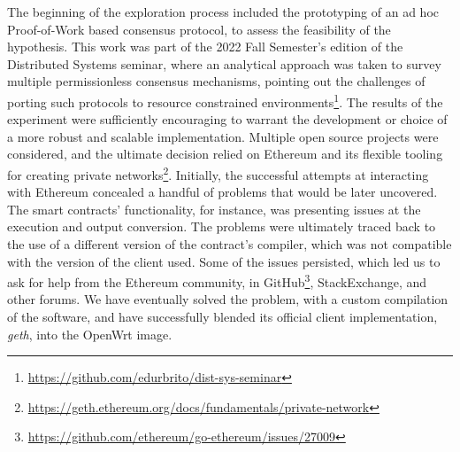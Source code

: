 The beginning of the exploration process included the prototyping of an ad hoc Proof-of-Work based consensus protocol, to assess the feasibility of the hypothesis. This work was part of the 2022 Fall Semester's edition of the Distributed Systems seminar, where an analytical approach was taken to survey multiple permissionless consensus mechanisms, pointing out the challenges of porting such protocols to resource constrained environments\footnote{\url{https://github.com/edurbrito/dist-sys-seminar}}. The results of the experiment were sufficiently encouraging to warrant the development or choice of a more robust and scalable implementation. Multiple open source projects were considered, and the ultimate decision relied on Ethereum and its flexible tooling for creating private networks\footnote{\url{https://geth.ethereum.org/docs/fundamentals/private-network}}. Initially, the successful attempts at interacting with Ethereum concealed a handful of problems that would be later uncovered. The smart contracts' functionality, for instance, was presenting issues at the execution and output conversion. The problems were ultimately traced back to the use of a different version of the contract's compiler, which was not compatible with the version of the client used. Some of the issues persisted, which led us to ask for help from the Ethereum community, in GitHub\footnote{\url{https://github.com/ethereum/go-ethereum/issues/27009}}, StackExchange, and other forums. We have eventually solved the problem, with a custom compilation of the software, and have successfully blended its official client implementation, \emph{geth}, into the OpenWrt image.

